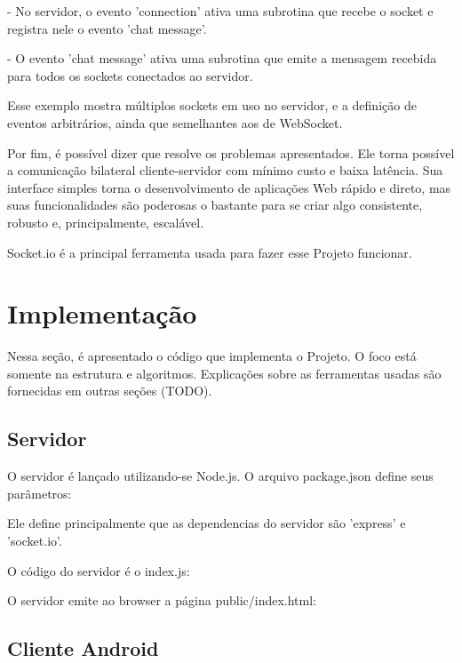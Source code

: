 \documentclass[a4paper,12pt]{article}
\begin{document}
- No servidor, o evento 'connection' ativa uma subrotina que recebe o socket e registra nele o evento 'chat message'.

- O evento 'chat message' ativa uma subrotina que emite a mensagem recebida para todos os sockets conectados ao servidor.

Esse exemplo mostra múltiplos sockets em uso no servidor, e a definição de eventos arbitrários, ainda que semelhantes aos de WebSocket.

Por fim, é possível dizer que resolve os problemas apresentados. Ele torna possível a comunicação bilateral cliente-servidor com mínimo custo e baixa latência. Sua interface simples torna o desenvolvimento de aplicações Web rápido e direto, mas suas funcionalidades são poderosas o bastante para se criar algo consistente, robusto e, principalmente, escalável.

Socket.io é a principal ferramenta usada para fazer esse Projeto funcionar.

\newpage


\section{Implementação}

Nessa seção, é apresentado o código que implementa o Projeto. O foco está somente na estrutura e algoritmos. Explicações sobre as ferramentas usadas são fornecidas em outras seções (TODO).

\subsection{Servidor}

O servidor é lançado utilizando-se Node.js. O arquivo package.json define seus parâmetros:


Ele define principalmente que as dependencias do servidor são 'express' e 'socket.io'.

O código do servidor é o index.js:



O servidor emite ao browser a página public/index.html:



\subsection{Cliente Android}
\end{document}
